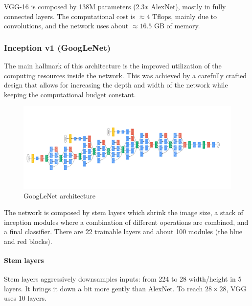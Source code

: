 VGG-16 is composed by 138M parameters ($2.3x$ AlexNet), mostly in fully connected layers.
The computational cost is $\approx 4$ Tflops, mainly due to convolutions, and the network uses about $\approx 16.5$ GB of memory.

\subsubsection{Inception v1 (GoogLeNet)}
The main hallmark of this architecture is the improved utilization of the computing resources inside the network.
This was achieved by a carefully crafted design that allows for increasing the depth and width of the network while keeping the computational budget constant.

\begin{figure}[htbp]
  \centering
  \includegraphics[width=0.99\linewidth]{./img/googlenet.png}
  \caption{GoogLeNet architecture}
\end{figure}

The network is composed by stem layers which shrink the image size, a stack of inception modules where a combination of different operations are combined, and a final classifier.
There are 22 trainable layers and about 100 modules (the blue and red blocks).

\paragraph{Stem layers}
Stem layers aggressively downsamples inputs: from 224 to 28 width/height in 5 layers.
It brings it down a bit more gently than AlexNet.
To reach $28\times 28$, VGG uses 10 layers.

